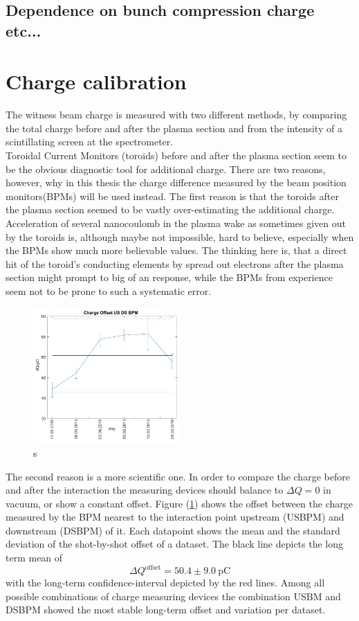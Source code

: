\subsection{Dependence on bunch compression charge etc...}
\section{Charge calibration}
The witness beam charge is measured with two different methods, by comparing the total charge before and after the plasma section and from the intensity of a scintillating screen at the spectrometer.\\
Toroidal Current Monitors (toroids) before and after the plasma section seem to be the obvious diagnostic tool for additional charge. 
There are two reasons, however, why in this thesis the charge difference measured by the beam position monitors(BPMs) will be used instead. 
The first reason is that the toroids after the plasma section seemed to be vastly over-estimating the additional charge. Acceleration of several nanocoulomb in the plasma wake as sometimes given out by the toroids is, although maybe not impossible, hard to believe, especially when the BPMs show much more believable values. The thinking here is, that 
a direct hit of the toroid's conducting elements by spread out electrons after the plasma section might prompt to big of an response, while the BPMs from experience seem not to be prone to such a systematic error. 
\begin{figure}[htbp]
\center
\includegraphics[width=0.5\textwidth]{experiment/images/edited/Charge_Tara.pdf}
\caption{s}
\label{img:Q_offset}
\end{figure}
The second reason is a more scientific one. 
In order to compare the charge before and after the interaction the measuring devices should balance to $\Delta Q =0$ in vacuum, or show a constant offset. Figure (\ref{img:Q_offset}) shows the offset between the charge measured by the  BPM nearest to the interaction point upstream (USBPM) and downstream (DSBPM) of it. Each datapoint shows the mean and the standard deviation of the shot-by-shot offset of a dataset. The black line depicts the long term mean of 
\begin{equation}
\Delta Q^\mathrm{offset}=50.4\pm 9.0\ \mathrm{pC}
\end{equation}
 with the long-term confidence-interval depicted by the red lines. Among all possible combinations of charge measuring devices the combination USBM and DSBPM showed the most stable long-term offset and variation per dataset.


